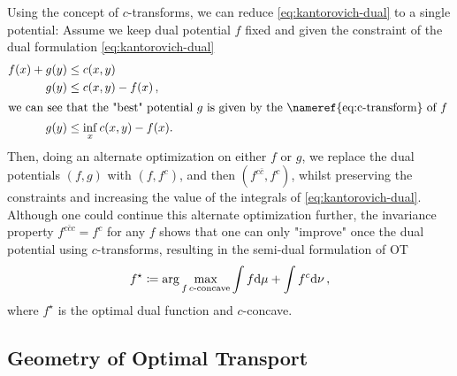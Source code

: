Using the concept of $c$-transforms, we can reduce \eqref{eq:kantorovich-dual} to a single potential: Assume we keep dual potential $f$ fixed and given the constraint of the dual formulation \eqref{eq:kantorovich-dual}
\begin{align*}
  f(x)+g(y) & \leq c(x, y) \\
  g(y) & \leq c(x, y)-f(x)\,, \\
  \intertext{we can see that the "best" potential $g$ is given by the \nameref{eq:c-transform} of $f$ }
  \label{eq:best_g} g(y) & \leq \inf _x c(x, y)-f(x).
\end{align*} 
Then, doing an alternate optimization on either $f$ or $g$, we replace the dual potentials $(f, g)$ with $(f, f^c)$, and then $(f^{c\bar{c}}, f^c)$, whilst preserving the constraints and increasing the value of the integrals of \eqref{eq:kantorovich-dual}.  
Although one could continue this alternate optimization further, the invariance property $f^{c\bar{c}c} = f^c$ for any $f$ shows that one can only "improve" once the dual potential using $c$-transforms, resulting in the semi-dual formulation of \acrlong{OT}
\begin{equation} \label{eq:semi-dual}
  f^\star \coloneqq \arg\max_{f\, c\text{-concave}} \int f \textrm{d}\mu + \int f^c\textrm{d}\nu\,,
\end{equation}
where $f^\star$ is the optimal dual function and $c$-concave.
\subsection{Geometry of Optimal Transport}
\label{sec:background_brenier}

